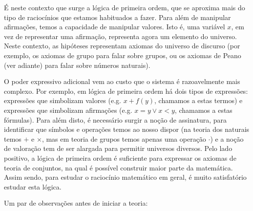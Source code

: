 \documentclass{report}
\theoremstyle{definition}
\theoremstyle{remark}
\begin{document}
	É neste contexto que surge a lógica de primeira ordem, que se aproxima mais do tipo de raciocínios que estamos habituados a fazer. Para além de manipular afirmações, temos a capacidade de manipular valores. Isto é, uma variável $x$, em vez de representar uma afirmação, representa agora um elemento do universo. Neste contexto, as hipóteses representam axiomas do universo de discurso (por exemplo, os axiomas de grupo para falar sobre grupos, ou os axiomas de Peano (ver adiante) para falar sobre números naturais).
	
	O poder expressivo adicional vem ao custo que o sistema é razoavelmente mais complexo. Por exemplo, em lógica de primeira ordem há dois tipos de expressões: expressões que simbolizam valores (e.g. $x + f(y)$, chamamos a estas termos) e expressões que simbolizam afirmações (e.g. $x = y \lor x < y$, chamamos a estas fórmulas). Para além disto, é necessário surgir a noção de assinatura, para identificar que símbolos e operações temos ao nosso dispor (na teoria dos naturais temos $+$ e $\times$, mas em teoria de grupos temos apenas uma operação $\cdot$) e a noção de valoração tem de ser alargada para permitir universos diversos. Pelo lado positivo, a lógica de primeira ordem é suficiente para expressar os axiomas de teoria de conjuntos, na qual é possível construir maior parte da matemática. Assim sendo, para estudar o raciocínio matemático em geral, é muito satisfatório estudar esta lógica.
	
	Um par de observações antes de iniciar a teoria:
	
\end{document}
